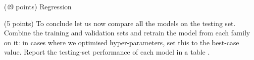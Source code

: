 \documentclass[12pt]{article}
\begin{document}
\begin{question}{\label{Q_LR_BA}(49 points) Regression}
\begin{subquestion}{(5 points) To conclude let us now compare all the models on the testing set. Combine the training and validation sets and retrain the model from each family on it: in cases where we optimised hyper-parameters, set this to the best-case value. Report the testing-set performance of each model in a table .}






\end{subquestion}

\end{question}

\end{document}
